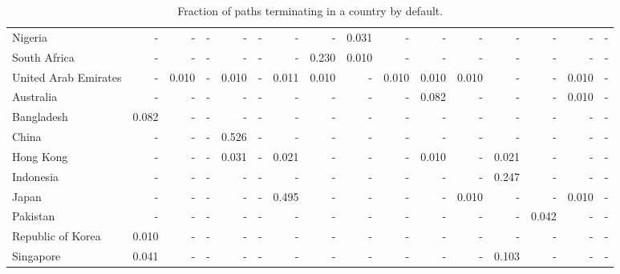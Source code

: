 \documentclass[10pt,twocolumn]{sig-alternate}
\begin{document}
\begin{table*}[t]
\begin{adjustbox}{width=1\textwidth}
\begin{tabular}{@{}ld{3.2}d{3.2}d{3.2}d{3.2}d{3.2}d{3.2}d{3.2}d{3.2}d{3.2}d{3.2}d{3.2}d{3.2}d{3.2}d{3.2}d{3.2}@{}}
Nigeria  & -  & -  & -  & -  & -  & -  & -  & 0.031 & -  & -  & -  & -  & -  & -  & - \\
South Africa  & -  & -  & -  & -  & -  & -  & 0.230 & 0.010 & -  & -  & -  & -  & -  & -  & - \\
United Arab Emirates  & -  & 0.010 & -  & 0.010 & -  & 0.011 & 0.010 & -  & 0.010 & 0.010 & 0.010 & -  & -  & 0.010 & - \\ \hline
Australia  & -  & -  & -  & -  & -  & -  & -  & -  & -  & 0.082 & -  & -  & -  & 0.010 & - \\
Bangladesh  & 0.082 & -  & -  & -  & -  & -  & -  & -  & -  & -  & -  & -  & -  & -  & - \\
China  & -  & -  & -  & 0.526 & -  & -  & -  & -  & -  & -  & -  & -  & -  & -  & - \\
Hong Kong  & -  & -  & -  & 0.031 & -  & 0.021 & -  & -  & -  & 0.010 & -  & 0.021 & -  & -  & - \\
Indonesia  & -  & -  & -  & -  & -  & -  & -  & -  & -  & -  & -  & 0.247 & -  & -  & - \\
Japan  & -  & -  & -  & -  & -  & 0.495 & -  & -  & -  & -  & 0.010 & -  & -  & 0.010 & - \\
Pakistan  & -  & -  & -  & -  & -  & -  & -  & -  & -  & -  & -  & -  & 0.042 & -  & - \\
Republic of Korea  & 0.010 & -  & -  & -  & -  & -  & -  & -  & -  & -  & -  & -  & -  & -  & - \\
Singapore  & 0.041 & -  & -  & -  & -  & -  & -  & -  & -  & -  & -  & 0.103 & -  & -  & - \\ \hline
\end{tabular}
\end{adjustbox}
\caption{Fraction of paths terminating in a country by default.}
\label{tab:host}
\end{table*}
\end{document}
